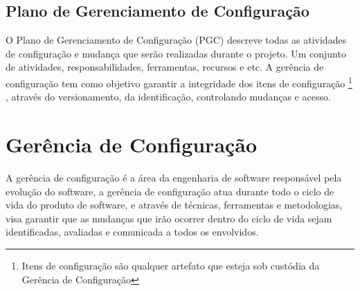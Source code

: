 \subsection{Plano de Gerenciamento de Configuração}
O Plano de Gerenciamento de Configuração (PGC) descreve todas as atividades de configuração e mudança que serão realizadas durante o projeto. Um conjunto de atividades, responsabilidades, ferramentas, recursos e etc. A gerência de configuração tem como objetivo garantir a integridade dos itens de configuração \footnote{Itens de configuração são qualquer artefato que esteja sob custódia da Gerência de Configuração} , através do versionamento, da identificação, controlando mudanças e acesso. 
\section{Gerência de Configuração}
A gerência de configuração é a área da engenharia de software responsável pela evolução do software, a gerência de configuração atua durante todo o ciclo de vida do produto de software, e através de técnicas, ferramentas e metodologias, visa garantir que as mudanças que irão ocorrer dentro do ciclo de vida sejam identificadas, avaliadas e comunicada a todos os envolvidos.

